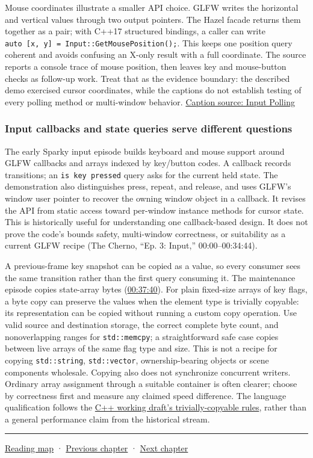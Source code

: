 Mouse coordinates illustrate a smaller API choice. GLFW writes the horizontal and vertical values through two output pointers. The Hazel facade returns them together as a pair; with C++17 structured bindings, a caller can write \texttt{auto\ {[}x,\ y{]}\ =\ Input::GetMousePosition();}. This keeps one position query coherent and avoids confusing an X-only result with a full coordinate. The source reports a console trace of mouse position, then leaves key and mouse-button checks as follow-up work. Treat that as the evidence boundary: the described demo exercised cursor coordinates, while the captions do not establish testing of every polling method or multi-window behavior. \href{https://www.youtube.com/watch?v=yuhNj8yGDJQ}{Caption source: Input Polling}

\subsubsection{Input callbacks and state queries serve different questions}\label{05-engine-i-ch013-input-callbacks-and-state-queries-serve-different-questions}

The early Sparky input episode builds keyboard and mouse support around GLFW callbacks and arrays indexed by key/button codes. A callback records transitions; an \texttt{is\ key\ pressed} query asks for the current held state. The demonstration also distinguishes press, repeat, and release, and uses GLFW's window user pointer to recover the owning window object in a callback. It revises the API from static access toward per-window instance methods for cursor state. This is historically useful for understanding one callback-based design. It does not prove the code's bounds safety, multi-window correctness, or suitability as a current GLFW recipe (The Cherno, ``Ep. 3: Input,'' 00:00--00:34:44).

A previous-frame key snapshot can be copied as a value, so every consumer sees the same transition rather than the first query consuming it. The maintenance episode copies state-array bytes (\href{https://www.youtube.com/watch?v=CKhGMoTNPOo&t=2260}{00:37:40}). For plain fixed-size arrays of key flags, a byte copy can preserve the values when the element type is trivially copyable: its representation can be copied without running a custom copy operation. Use valid source and destination storage, the correct complete byte count, and nonoverlapping ranges for \texttt{std::memcpy}; a straightforward safe case copies between live arrays of the same flag type and size. This is not a recipe for copying \texttt{std::string}, \texttt{std::vector}, ownership-bearing objects or scene components wholesale. Copying also does not synchronize concurrent writers. Ordinary array assignment through a suitable container is often clearer; choose by correctness first and measure any claimed speed difference. The language qualification follows the \href{https://eel.is/c++draft/basic.types\#basic.types.trivial}{C++ working draft's trivially-copyable rules}, rather than a general performance claim from the historical stream.

\begin{center}\rule{0.5\linewidth}{0.5pt}\end{center}

\hyperref[volume-reading-map]{Reading map} · \hyperref[05-engine-i-ch012-transactions-recovery-and-safe-project-boundaries]{Previous chapter} · \hyperref[05-engine-i-ch014-application-clocks-and-stable-input-identity]{Next chapter}
